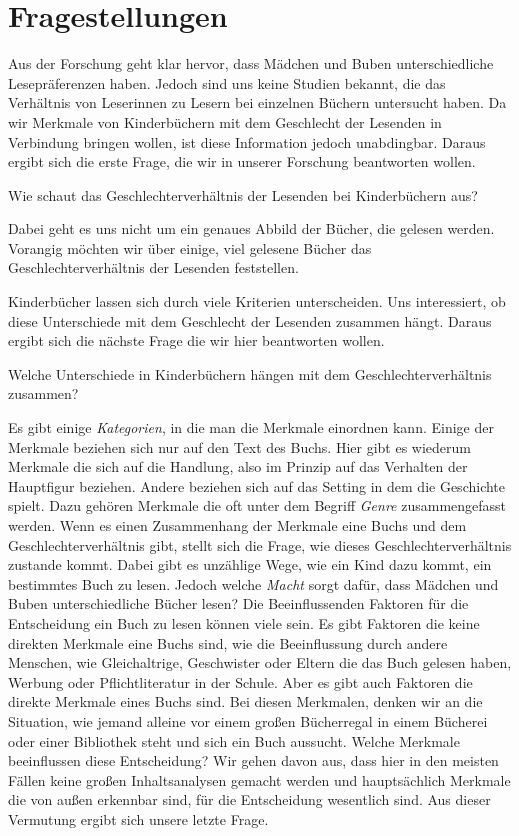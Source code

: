 \section{Fragestellungen}

Aus der Forschung geht klar hervor, dass Mädchen und Buben
unterschiedliche Lesepräferenzen haben. Jedoch sind uns keine Studien
bekannt, die das Verhältnis von Leserinnen zu Lesern bei einzelnen
Büchern untersucht haben. Da wir Merkmale von Kinderbüchern mit dem
Geschlecht der Lesenden in Verbindung bringen wollen, ist diese
Information jedoch unabdingbar. Daraus ergibt sich die erste Frage, die
wir in unserer Forschung beantworten wollen.

\begin{frage}\label{fra:andere}
   Wie schaut das Geschlechterverhältnis der Lesenden bei Kinderbüchern aus?
\end{frage}

Dabei geht es uns nicht um ein genaues Abbild der Bücher, die gelesen
werden. Vorangig möchten wir über einige, viel gelesene Bücher das
Geschlechterverhältnis der Lesenden feststellen.

Kinderbücher lassen sich durch viele Kriterien unterscheiden. Uns
interessiert, ob diese Unterschiede mit dem Geschlecht der Lesenden
zusammen hängt. Daraus ergibt sich die nächste Frage die wir hier
beantworten wollen.

\begin{frage}\label{fra:unterschiede}
Welche Unterschiede in Kinderbüchern hängen mit dem Geschlechterverhältnis zusammen?
\end{frage}

Es gibt einige \emph{Kategorien}, in die man die Merkmale einordnen
kann. Einige der Merkmale beziehen sich nur auf den Text des Buchs. Hier
gibt es wiederum Merkmale die sich auf die Handlung, also im Prinzip auf
das Verhalten der Hauptfigur beziehen. Andere beziehen sich auf das
Setting in dem die Geschichte spielt. Dazu gehören \zB Merkmale die oft
unter dem Begriff \emph{Genre} zusammengefasst werden. Wenn es einen
Zusammenhang der Merkmale eine Buchs und dem Geschlechterverhältnis
gibt, stellt sich die Frage, wie dieses Geschlechterverhältnis zustande
kommt. Dabei gibt es unzählige Wege, wie ein Kind dazu kommt, ein
bestimmtes Buch zu lesen. Jedoch welche \emph{Macht} sorgt dafür, dass
Mädchen und Buben unterschiedliche Bücher lesen? Die Beeinflussenden
Faktoren für die Entscheidung ein Buch zu lesen können viele sein. Es
gibt Faktoren die keine direkten Merkmale eine Buchs sind, wie \zB die
Beeinflussung durch andere Menschen, wie Gleichaltrige, Geschwister oder
Eltern die das Buch gelesen haben, Werbung oder Pflichtliteratur in der
Schule. Aber es gibt auch Faktoren die direkte Merkmale eines Buchs
sind. Bei diesen Merkmalen, denken wir an die Situation, wie jemand
alleine vor einem großen Bücherregal in einem Bücherei oder einer
Bibliothek steht und sich ein Buch aussucht. Welche Merkmale
beeinflussen diese Entscheidung? Wir gehen davon aus, dass hier in den
meisten Fällen keine großen Inhaltsanalysen gemacht werden und
hauptsächlich Merkmale die von außen erkennbar sind, für die
Entscheidung wesentlich sind. Aus dieser Vermutung ergibt sich unsere
letzte Frage.

